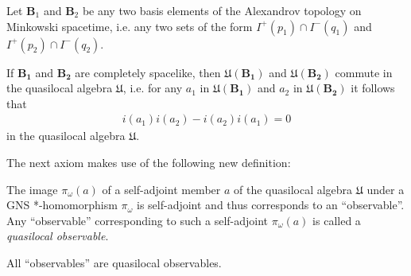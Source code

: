 \begin{axiom}
    \label{axm:local-commutativity}
    Let $\mathbf{B}_1$ and $\mathbf{B}_2$ be any two basis elements of the Alexandrov topology on Minkowski spacetime, i.e. any two sets of the form $I^+(p_1) \cap I^-(q_1)$ and $I^+(p_2) \cap I^-(q_2)$.
    
    If $\mathbf{B_1}$ and $\mathbf{B_2}$ are completely spacelike, then $\mathfrak{U}(\mathbf{B_1})$ and $\mathfrak{U}(\mathbf{B_2})$ commute in the quasilocal algebra $\mathfrak{U}$, i.e. for any $a_1$ in $\mathfrak{U}(\mathbf{B_1})$ and $a_2$ in $\mathfrak{U}(\mathbf{B_2})$ it follows that
    \begin{align}
        i(a_1) i(a_2) - i(a_2) i(a_1) = 0
    \end{align}
    in the quasilocal algebra $\mathfrak{U}$.
\end{axiom}

The next axiom makes use of the following new definition:

\begin{definition}
    \label{def:quasilocal-observable}
    The image $\pi_\omega(a)$ of a self-adjoint member $a$ of the quasilocal algebra $\mathfrak{U}$ under a GNS *-homomorphism $\pi_\omega$ is self-adjoint and thus corresponds to an ``observable''. Any ``observable'' corresponding to such a self-adjoint $\pi_\omega(a)$ is called a \textit{quasilocal observable}.
\end{definition}

\begin{axiom}
    \label{axm:quasilocal-algebra}
    All ``observables'' are quasilocal observables.
\end{axiom}

